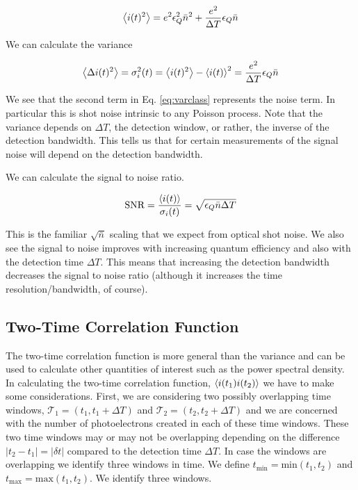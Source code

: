 \documentclass[12pt]{article}
\newcommand{\ep}{\epsilon}
\newcommand{\mc}[1]{\mathcal{#1}}
\begin{document}
\begin{align}
\label{eq:varclass}
\Braket{i(t)^2} = e^2 \ep_Q^2 \bar{n}^2 + \frac{e^2}{\Delta T} \ep_Q \bar{n}
\end{align}

We can calculate the variance

\begin{align}
\Braket{\Delta i(t)^2} = \sigma_i^2(t) = \Braket{i(t)^2} - \Braket{i(t)}^2 = \frac{e^2}{\Delta T} \ep_Q \bar{n}
\end{align}

We see that the second term in Eq. \eqref{eq:varclass} represents the noise term. In particular this is shot noise intrinsic to any Poisson process. Note that the variance depends on $\Delta T$, the detection window, or rather, the inverse of the detection bandwidth. This tells us that for certain measurements of the signal noise will depend on the detection bandwidth.

 We can calculate the signal to noise ratio.

\begin{align}
\label{SNR}
\text{SNR} = \frac{\Braket{i(t)}}{\sigma_i(t)} = \sqrt{\ep_Q \bar{n} \Delta T}
\end{align}

This is the familiar $\sqrt{\bar{n}}$ scaling that we expect from optical shot noise. We also see the signal to noise improves with increasing quantum efficiency and also with the detection time $\Delta T$. This means that increasing the detection bandwidth decreases the signal to noise ratio (although it increases the time resolution/bandwidth, of course).

\subsection{Two-Time Correlation Function}

The two-time correlation function is more general than the variance and can be used to calculate other quantities of interest such as the power spectral density. In calculating the two-time correlation function, $\Braket{i(t_1)i(t_2)}$ we have to make some considerations. First, we are considering two possibly overlapping time windows, $\mc{T}_1 = (t_1, t_1+\Delta T)$ and $\mc{T}_2 = (t_2, t_2+\Delta T)$ and we are concerned with the number of photoelectrons created in each of these time windows. These two time windows may or may not be overlapping depending on the difference $|t_2-t_1|=|\delta t|$ compared to the detection time $\Delta T$. In case the windows are overlapping we identify three windows in time. We define $t_{\text{min}} = \text{min}(t_1,t_2)$ and $t_{\text{max}} = \text{max}(t_1,t_2)$. We identify three windows. 
\end{document}
